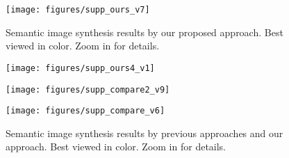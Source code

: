 \documentclass{article}
\begin{document}
\begin{figure}[h]
\centering
\texttt{[image: figures/supp\_ours\_v7]}
\caption{Semantic image synthesis results by our proposed approach. Best viewed in color. Zoom in for details.}
\label{fig:ours}
\end{figure}

\begin{figure}[h]
\centering
\texttt{[image: figures/supp\_ours4\_v1]}
\end{figure}

\begin{figure}[t]
\centering
\texttt{[image: figures/supp\_compare2\_v9]}
\label{fig:compare}
\end{figure}

\begin{figure}[t]
\centering
\texttt{[image: figures/supp\_compare\_v6]}
\caption{Semantic image synthesis results by previous approaches and our approach. Best viewed in color. Zoom in for details.}
\label{fig:compare}
\end{figure}
\end{document}
